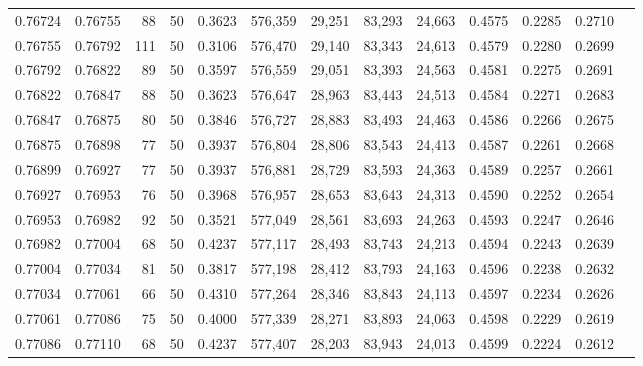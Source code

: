 \begin{tabular}{rrrrrrrrrrrrr}
0.76724 & 0.76755 &    88 &  50 &                                     0.3623 & 576,359 &  29,251 &  83,293 &  24,663 & 0.4575 & 0.2285 & 0.2710 \\
0.76755 & 0.76792 &   111 &  50 &                                     0.3106 & 576,470 &  29,140 &  83,343 &  24,613 & 0.4579 & 0.2280 & 0.2699 \\
0.76792 & 0.76822 &    89 &  50 &                                     0.3597 & 576,559 &  29,051 &  83,393 &  24,563 & 0.4581 & 0.2275 & 0.2691 \\
0.76822 & 0.76847 &    88 &  50 &                                     0.3623 & 576,647 &  28,963 &  83,443 &  24,513 & 0.4584 & 0.2271 & 0.2683 \\
0.76847 & 0.76875 &    80 &  50 &                                     0.3846 & 576,727 &  28,883 &  83,493 &  24,463 & 0.4586 & 0.2266 & 0.2675 \\
0.76875 & 0.76898 &    77 &  50 &                                     0.3937 & 576,804 &  28,806 &  83,543 &  24,413 & 0.4587 & 0.2261 & 0.2668 \\
0.76899 & 0.76927 &    77 &  50 &                                     0.3937 & 576,881 &  28,729 &  83,593 &  24,363 & 0.4589 & 0.2257 & 0.2661 \\
0.76927 & 0.76953 &    76 &  50 &                                     0.3968 & 576,957 &  28,653 &  83,643 &  24,313 & 0.4590 & 0.2252 & 0.2654 \\
0.76953 & 0.76982 &    92 &  50 &                                     0.3521 & 577,049 &  28,561 &  83,693 &  24,263 & 0.4593 & 0.2247 & 0.2646 \\
0.76982 & 0.77004 &    68 &  50 &                                     0.4237 & 577,117 &  28,493 &  83,743 &  24,213 & 0.4594 & 0.2243 & 0.2639 \\
0.77004 & 0.77034 &    81 &  50 &                                     0.3817 & 577,198 &  28,412 &  83,793 &  24,163 & 0.4596 & 0.2238 & 0.2632 \\
0.77034 & 0.77061 &    66 &  50 &                                     0.4310 & 577,264 &  28,346 &  83,843 &  24,113 & 0.4597 & 0.2234 & 0.2626 \\
0.77061 & 0.77086 &    75 &  50 &                                     0.4000 & 577,339 &  28,271 &  83,893 &  24,063 & 0.4598 & 0.2229 & 0.2619 \\
0.77086 & 0.77110 &    68 &  50 &                                     0.4237 & 577,407 &  28,203 &  83,943 &  24,013 & 0.4599 & 0.2224 & 0.2612 \\

\end{tabular}
